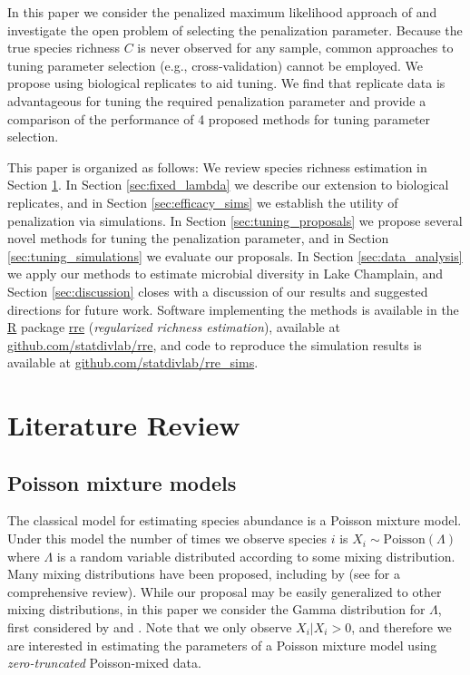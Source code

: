 \documentclass[12pt]{article}
\begin{document}
In this paper we consider the penalized maximum likelihood approach of \citet{wang_2005} and investigate the open problem of selecting the penalization parameter. Because the true species richness $C$ is never observed for any sample, common approaches to tuning parameter selection (e.g., cross-validation) cannot be employed. We propose using biological replicates to aid tuning. %
We find that replicate data is advantageous for tuning the required penalization parameter and provide a comparison of the performance of 4 proposed methods for tuning parameter selection.

This paper is organized as follows: We review species richness estimation in Section \ref{sec:literature_review}.  In Section \ref{sec:fixed_lambda} we describe our extension to biological replicates, and in Section \ref{sec:efficacy_sims} we establish the utility of penalization via simulations. In Section \ref{sec:tuning_proposals} we propose several novel methods for tuning the penalization parameter, and in Section \ref{sec:tuning_simulations}
we evaluate our proposals. In Section \ref{sec:data_analysis} we apply our methods to estimate microbial diversity in Lake Champlain, and Section \ref{sec:discussion} closes with a discussion of our results and suggested directions for future work. Software implementing the methods is available in the \url{R} package \url{rre} (\textit{regularized richness estimation}), available at \url{github.com/statdivlab/rre}, and code to reproduce the simulation results is available at \url{github.com/statdivlab/rre_sims}.


\section{Literature Review}

\label{sec:literature_review}

\subsection{Poisson mixture models}

The classical model for estimating species abundance is a Poisson mixture model.  Under this model the number of times we observe species $i$ is $X_i \sim \text{Poisson}(\Lambda)$ where $\Lambda$ is a random variable distributed according to some mixing distribution.
Many mixing distributions have been proposed, including by  \cite{bulmer_1974,ord_1986,norris_1998} (see \cite{bunge_1993} for a comprehensive review). While our proposal may be easily generalized to other mixing distributions, in this paper we consider the Gamma  distribution for $\Lambda$, first considered by \citet{greenwood_yule} and \citet{fisher_1943}.
Note that we only observe $X_i | X_i > 0$, and therefore we are interested in estimating the parameters of a Poisson mixture model using \textit{zero-truncated} Poisson-mixed data.
\end{document}
